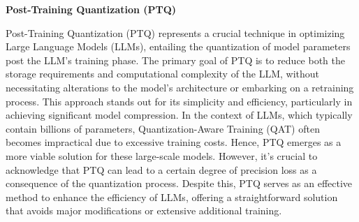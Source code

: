 \noindent\textbf{Post-Training Quantization (PTQ)}

Post-Training Quantization (PTQ) represents a crucial technique in optimizing Large Language Models (LLMs), entailing the quantization of model parameters post the LLM's training phase. The primary goal of PTQ is to reduce both the storage requirements and computational complexity of the LLM, without necessitating alterations to the model's architecture or embarking on a retraining process. This approach stands out for its simplicity and efficiency, particularly in achieving significant model compression. In the context of LLMs, which typically contain billions of parameters, Quantization-Aware Training (QAT) often becomes impractical due to excessive training costs. Hence, PTQ emerges as a more viable solution for these large-scale models. However, it's crucial to acknowledge that PTQ can lead to a certain degree of precision loss as a consequence of the quantization process. Despite this, PTQ serves as an effective method to enhance the efficiency of LLMs, offering a straightforward solution that avoids major modifications or extensive additional training.

